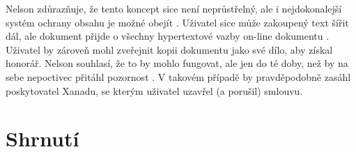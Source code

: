 \label{p:xanadu:transc:infring}
Nelson zdůrazňuje, že tento koncept sice není neprůstřelný, ale i nejdokonalejší systém ochrany obsahu je možné obejít \autocite{Tpub-Objections}. Uživatel sice může zakoupený text šířit dál, ale dokument přijde o všechny hypertextové vazby on-line dokumentu \autocite[2/48]{LitMachines}. Uživatel by zároveň mohl zveřejnit kopii dokumentu jako své dílo, aby získal honorář. Nelson souhlasí, že to by mohlo fungovat, ale jen do té doby, než by na sebe nepoctivec přitáhl pozornost \autocite[2/60]{LitMachines}. V takovém případě by pravděpodobně zasáhl poskytovatel Xanadu, se kterým uživatel uzavřel (a porušil) smlouvu.











\section{Shrnutí}
\label{sec:xanadu:summary}


